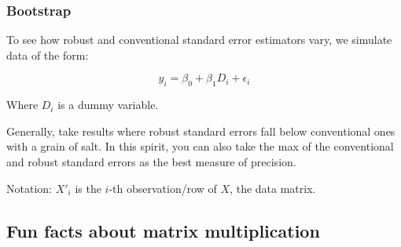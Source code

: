 \documentclass[12 pt, leqno]{article}
\begin{document}
\subsubsection*{Bootstrap}
 
To see how robust and conventional standard error estimators vary, we simulate data of the form:

$$y_i = \beta_0 + \beta_1 D_i + \epsilon_i$$

Where $D_i$ is a dummy variable. 

Generally, take results where robust standard errors fall below conventional ones with a grain of salt. In this spirit, you can also take the max of the conventional and robust standard errors as the best measure of precision.

Notation: $X'_i$ is the $i$-th observation/row of $X$, the data matrix. 

\subsection*{Fun facts about matrix multiplication}
\end{document}
